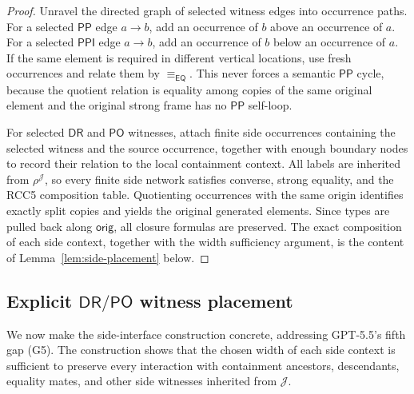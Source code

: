 \documentclass[11pt]{article}
\newcommand{\EQ}{\mathsf{EQ}}
\newcommand{\DR}{\mathsf{DR}}
\newcommand{\PO}{\mathsf{PO}}
\newcommand{\PP}{\mathsf{PP}}
\newcommand{\PPI}{\mathsf{PPI}}
\newcommand{\J}{\mathcal J}
\newcommand{\orig}{\mathsf{orig}}
\newcommand{\eqc}{\equiv_{\EQ}}
\begin{document}
\begin{proof}
Unravel the directed graph of selected witness edges into occurrence paths.  For a selected $\PP$ edge $a\to b$, add an occurrence of $b$ above an occurrence of $a$.  For a selected $\PPI$ edge $a\to b$, add an occurrence of $b$ below an occurrence of $a$.  If the same element is required in different vertical locations, use fresh occurrences and relate them by $\eqc$.  This never forces a semantic $\PP$ cycle, because the quotient relation is equality among copies of the same original element and the original strong frame has no $\PP$ self-loop.

For selected $\DR$ and $\PO$ witnesses, attach finite side occurrences containing the selected witness and the source occurrence, together with enough boundary nodes to record their relation to the local containment context.  All labels are inherited from $\rho^\J$, so every finite side network satisfies converse, strong equality, and the RCC5 composition table.  Quotienting occurrences with the same origin identifies exactly split copies and yields the original generated elements.  Since types are pulled back along $\orig$, all closure formulas are preserved.  The exact composition of each side context, together with the width sufficiency argument, is the content of Lemma~\ref{lem:side-placement} below.
\end{proof}

\subsection{Explicit \texorpdfstring{$\DR/\PO$}{DR/PO} witness placement}
\label{ssec:dr-po-placement}

We now make the side-interface construction concrete, addressing
GPT-5.5's fifth gap (G5).  The construction shows that the chosen
width of each side context is sufficient to preserve every
interaction with containment ancestors, descendants, equality mates,
and other side witnesses inherited from $\J$.
\end{document}
